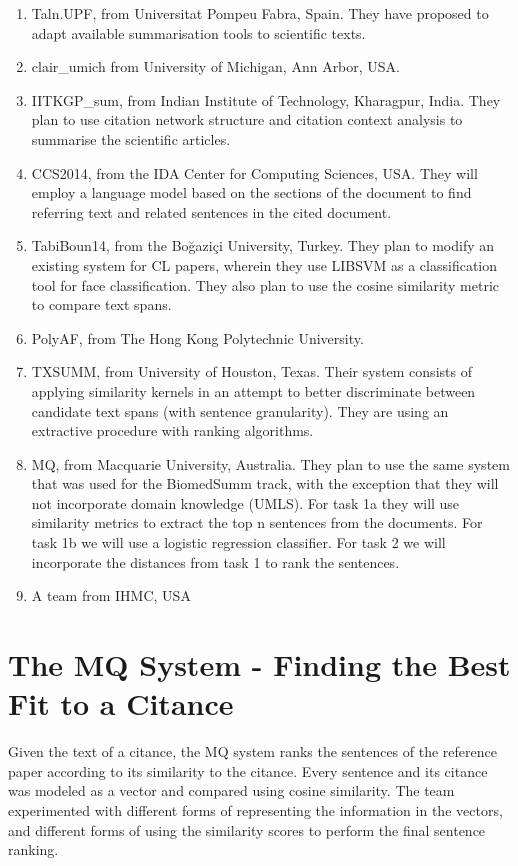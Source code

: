 \documentclass[11pt]{article}
\begin{document}
\begin{enumerate}
\item{Taln.UPF, from Universitat Pompeu Fabra, Spain. They have proposed to 
		adapt available summarisation tools to scientific texts.}
\item{clair\_umich from University of Michigan, Ann Arbor, USA.}
\item{IITKGP\_sum, from Indian Institute of Technology, Kharagpur, India. They 
		plan to use citation network structure and citation context analysis to 
		summarise the scientific articles.}
\item{CCS2014, from the IDA Center for Computing Sciences, USA. They will 
		employ a language model based on the sections of the document to find 
		referring text and related sentences in the cited document.}
\item{TabiBoun14, from the Boğaziçi University, Turkey. They plan to modify an 
	existing system for CL papers, wherein they use LIBSVM as a classification 
		tool for face classification. They also plan to use the cosine similarity 
		metric to compare text spans.}
\item{PolyAF, from The Hong Kong Polytechnic University.}
\item{TXSUMM, from University of Houston, Texas. Their system consists of applying 
	similarity kernels in an attempt to better discriminate between candidate text 
	spans (with sentence granularity). They are using an extractive procedure with 
	ranking algorithms.}
\item{MQ, from Macquarie University, Australia. They plan to use the same system that 
	was used for the BiomedSumm track, with the exception that they will not incorporate 
	domain knowledge (UMLS). For task 1a they will use similarity metrics to extract the 
	top n sentences from the documents. For task 1b we will use a logistic regression 
	classifier. For task 2 we will incorporate the distances from task 1 to rank the sentences.}
\item{A team from IHMC, USA}

\end{enumerate}

\section{The MQ System - Finding the Best Fit to a Citance}

Given the text of a citance, the MQ system ranks the sentences of the 
reference paper according to its similarity to the citance. Every sentence 
and its citance was modeled as a vector and compared using cosine similarity. 
The team experimented with different forms of representing the information in 
the vectors, and different forms of using the similarity scores to perform the 
final sentence ranking.
\end{document}
